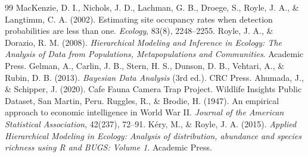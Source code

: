 \documentclass[11pt,a4paper]{article}
\begin{document}
\begin{thebibliography}{99}
 MacKenzie, D. I., Nichols, J. D., Lachman, G. B., Droege, S., Royle, J. A., \& Langtimm, C. A. (2002). Estimating site occupancy rates when detection probabilities are less than one. \textit{Ecology}, 83(8), 2248--2255.
 Royle, J. A., \& Dorazio, R. M. (2008). \textit{Hierarchical Modeling and Inference in Ecology: The Analysis of Data from Populations, Metapopulations and Communities}. Academic Press.
 Gelman, A., Carlin, J. B., Stern, H. S., Dunson, D. B., Vehtari, A., \& Rubin, D. B. (2013). \textit{Bayesian Data Analysis} (3rd ed.). CRC Press.
 Ahumada, J., \& Schipper, J. (2020). Cafe Fauna Camera Trap Project. Wildlife Insights Public Dataset, San Martin, Peru.
 Ruggles, R., \& Brodie, H. (1947). An empirical approach to economic intelligence in World War II. \textit{Journal of the American Statistical Association}, 42(237), 72--91.
 K{\'e}ry, M., \& Royle, J. A. (2015). \textit{Applied Hierarchical Modeling in Ecology: Analysis of distribution, abundance and species richness using R and BUGS: Volume 1}. Academic Press.
\end{thebibliography}
\end{document}
